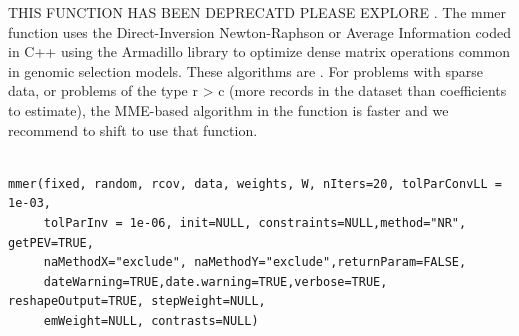\documentclass[a4paper]{book}
\begin{document}
%
\begin{Description}\relax

THIS FUNCTION HAS BEEN DEPRECATD PLEASE EXPLORE . The mmer 
function uses the Direct-Inversion Newton-Raphson or Average Information coded in 
C++ using the Armadillo library to optimize dense matrix operations common in
genomic selection models. These algorithms are . For problems with sparse data, or problems of 
the type r > c (more records in the dataset than coefficients to estimate), the 
MME-based algorithm in the  function is faster and we recommend 
to shift to use that function.

\end{Description}
%
\begin{Usage}
\begin{verbatim}

mmer(fixed, random, rcov, data, weights, W, nIters=20, tolParConvLL = 1e-03, 
     tolParInv = 1e-06, init=NULL, constraints=NULL,method="NR", getPEV=TRUE,
     naMethodX="exclude", naMethodY="exclude",returnParam=FALSE, 
     dateWarning=TRUE,date.warning=TRUE,verbose=TRUE, reshapeOutput=TRUE, stepWeight=NULL,
     emWeight=NULL, contrasts=NULL)
\end{verbatim}
\end{Usage}
%
\end{document}
